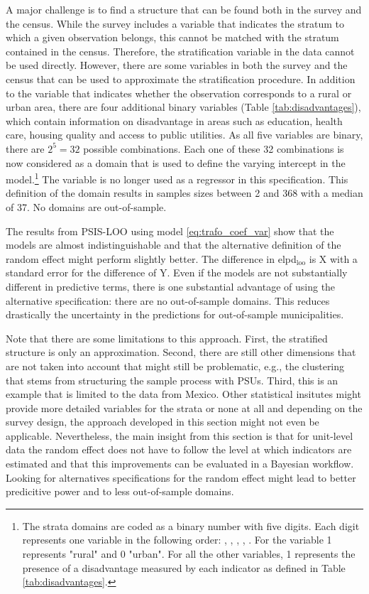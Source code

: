 A major challenge is to find a structure that can be found both in the survey and the census.
While the survey includes a variable that indicates the stratum to which a given observation belongs, this cannot be matched with the stratum contained in the census.
Therefore, the stratification variable in the data cannot be used directly.
However, there are some variables in both the survey and the census that can be used to approximate the stratification procedure.
In addition to the  variable that indicates whether the observation corresponds to a rural or urban area, there are four additional binary variables (Table \ref{tab:disadvantages}), which contain information on disadvantage in areas such as education, health care, housing quality and access to public utilities.
As all five variables are binary, there are $2^5 = 32$ possible combinations.
Each one of these 32 combinations is now considered as a domain that is used to define the varying intercept in the model.\footnote{The strata domains are coded as a binary number with five digits. Each digit represents one variable in the following order: , , , , . For the  variable 1 represents "rural" and 0 "urban". For all the other variables, 1 represents the presence of a disadvantage measured by each indicator as defined in Table \ref{tab:disadvantages}.}
The variable  is no longer used as a regressor in this specification.
This definition of the domain results in samples sizes between 2 and 368 with a median of 37.
No domains are out-of-sample.

The results from PSIS-LOO using model \ref{eq:trafo_coef_var} show that the models are almost indistinguishable and that the alternative definition of the random effect might perform slightly better. The difference in elpd$_{\text{loo}}$ is X with a standard error for the difference of Y.
Even if the models are not substantially different in predictive terms, there is one substantial advantage of using the alternative specification: there are no out-of-sample domains.
This reduces drastically the uncertainty in the predictions for out-of-sample municipalities.

Note that there are some limitations to this approach.
First, the stratified structure is only an approximation.
Second, there are still other dimensions that are not taken into account that might still be problematic, e.g., the clustering that stems from structuring the sample process with PSUs.
Third, this is an example that is limited to the data from Mexico.
Other statistical insitutes might provide more detailed variables for the strata or none at all and depending on the survey design, the approach developed in this section might not even be applicable.
Nevertheless, the main insight from this section is that for unit-level data the random effect does not have to follow the level at which indicators are estimated and that this improvements can be evaluated in a Bayesian workflow.
Looking for alternatives specifications for the random effect might lead to better predicitive power and to less out-of-sample domains.